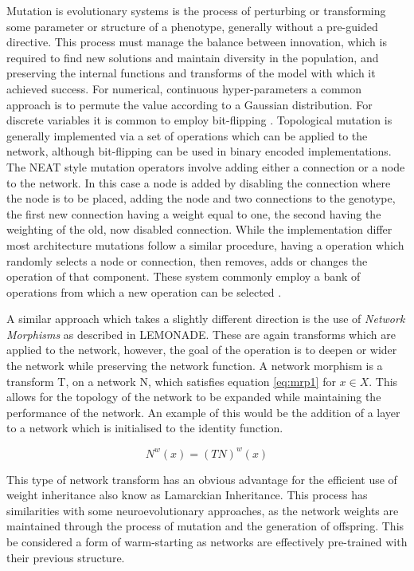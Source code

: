 		Mutation is evolutionary systems is the process of perturbing or transforming some parameter or structure of a phenotype, generally without a pre-guided directive. This process must manage the balance between innovation, which is required to find new solutions and maintain diversity in the population, and preserving the internal functions and transforms of the model with which it achieved success. For numerical, continuous hyper-parameters a common approach is to permute the value according to a Gaussian distribution. For discrete variables it is common to employ bit-flipping \cite{25,39}. Topological mutation is generally implemented via a set of operations which can be applied to the network, although bit-flipping can be used in binary encoded implementations\cite{5}. The NEAT style mutation operators involve adding either a connection or a node to the network. In this case a node is added by disabling the connection where the node is to be placed, adding the node and two connections to the genotype, the first new connection having a weight equal to one, the second having the weighting of the old, now disabled connection. While the implementation differ most architecture mutations follow a similar procedure, having a operation which randomly selects a node or connection, then removes, adds or changes the operation of that component. These system commonly employ a bank of operations from which a new operation can be selected \cite{42,4}.
		\par
		A similar approach which takes a slightly different direction is the use of \textit{Network Morphisms} as described in LEMONADE. These are again transforms which are applied to the network, however, the goal of the operation is to deepen or wider the network while preserving the network function. A network morphism is a transform T, on a network N, which satisfies equation \ref{eq:mrp1} for \(x \in X\). This allows for the topology of the network to be expanded while maintaining the performance of the network. An example of this would be the addition of a layer to a network which is initialised to the identity function.
	
		\begin{equation}\label{eq:mrp1}
			N^w(x) = (TN)^w(x)
		\end{equation}

		This type of network transform has an obvious advantage for the efficient use of weight inheritance also know as Lamarckian Inheritance. This process has similarities with some neuroevolutionary approaches, as the network weights are maintained through the process of mutation and the generation of offspring. This be considered a form of warm-starting as networks are effectively pre-trained with their previous structure.   

